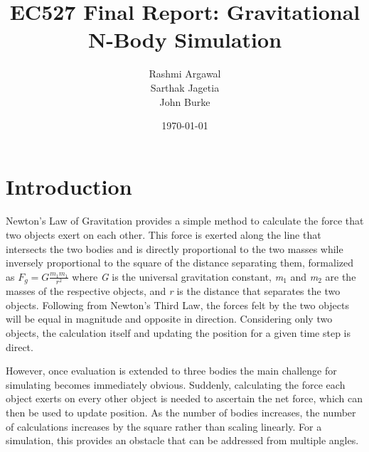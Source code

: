 \documentclass[11pt]{article}
\author{Rashmi Argawal\\
        Sarthak Jagetia\\
        John Burke}
\title{EC527 Final Report: Gravitational N-Body Simulation}
\date{\today}
\begin{document}
\maketitle

\section{Introduction}
\paragraph{}
Newton's Law of Gravitation provides a simple method to calculate the force that two objects exert on each other.  This force is exerted along the line that intersects the two bodies and is directly proportional to the two masses while inversely proportional to the square of the distance separating them, formalized as $F_g = G\frac{m_1m_1}{r^2}$ where \textit{G} is the universal gravitation constant, \textit{m}$_1$ and \textit{m}$_2$  are the masses of the respective objects, and \textit{r} is the distance that separates the two objects.  Following from Newton's Third Law, the forces felt by the two objects will be equal in magnitude and opposite in direction.  Considering only two objects, the calculation itself and updating the position for a given time step is direct.

However, once evaluation is extended to three bodies the main challenge for simulating becomes immediately obvious.  Suddenly, calculating the force each object exerts on every other object is needed to ascertain the net force, which can then be used to update position.  As the number of bodies increases, the number of calculations increases by the square rather than scaling linearly.  For a simulation, this provides an obstacle that can be addressed from multiple angles.



\begin{thebibliography}{99}

\end{thebibliography}
\end{document}
